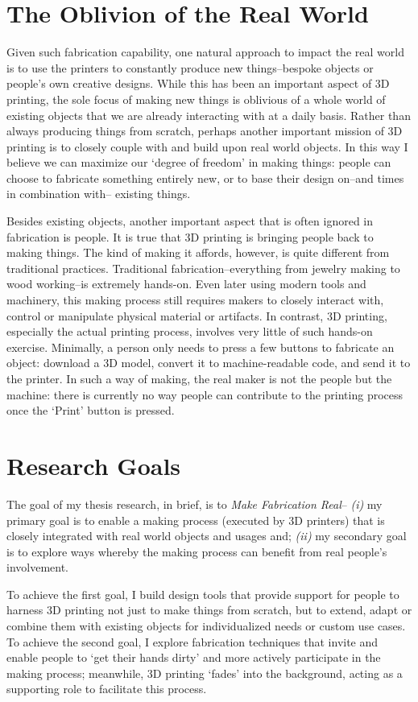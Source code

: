 \section{The Oblivion of the Real World}
Given such fabrication capability, one natural approach to impact the real world is to use the printers to constantly produce new things--bespoke objects or people's own creative designs. While this has been an important aspect of 3D printing, the sole focus of making new things is oblivious of a whole world of existing objects that we are already interacting with at a daily basis. Rather than always producing things from scratch, perhaps another important mission of 3D printing is to closely couple with and build upon real world objects. In this way I believe we can maximize our `degree of freedom' in making things: people can choose to fabricate something entirely new, or to base their design on--and times in combination with-- existing things.

Besides existing objects, another important aspect that is often ignored in fabrication is people. It is true that 3D printing is bringing people back to making things. The kind of making it affords, however, is quite different from traditional practices. Traditional fabrication--everything from jewelry making to wood working--is extremely hands-on. Even later using modern tools and machinery, this making process still requires makers to closely interact with, control or manipulate physical material or artifacts. In contrast, 3D printing, especially the actual printing process, involves very little of such hands-on exercise. Minimally, a person only needs to press a few buttons to fabricate an object: download a 3D model, convert it to machine-readable code, and send it to the printer. In such a way of making, the real maker is not the people but the machine: there is currently no way people can contribute to the printing process once the `Print' button is pressed.

\section{Research Goals}
The goal of my thesis research, in brief, is to \textit{Make Fabrication Real}-- {\em (i)} my primary goal is to enable a making process (executed by 3D printers) that is closely integrated with real world objects and usages and; {\em (ii)} my secondary goal is to explore ways whereby the making process can benefit from real people's involvement.

To achieve the first goal, I build design tools that provide support for people to harness 3D printing not just to make things from scratch, but to extend, adapt or combine them with existing objects for individualized needs or custom use cases. To achieve the second goal, I explore fabrication techniques that invite and enable people to `get their hands dirty' and more actively participate in the making process; meanwhile, 3D printing `fades' into the background, acting as a supporting role to facilitate this process.

